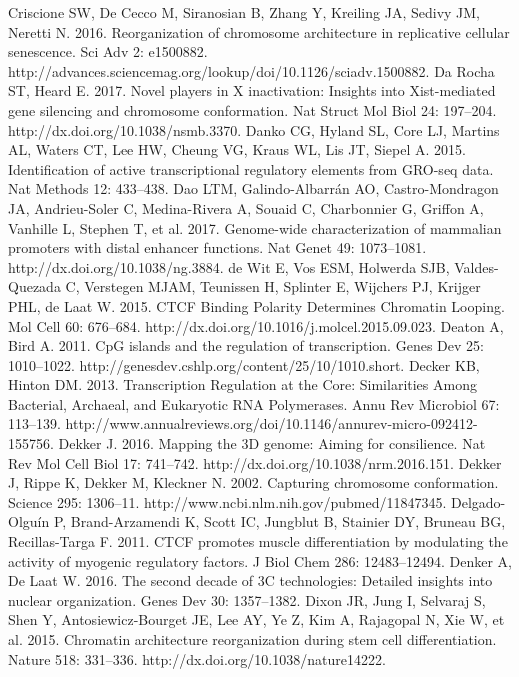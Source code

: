 \begin{thebibliography}{1}
	 Criscione SW, De Cecco M, Siranosian B, Zhang Y, Kreiling JA, Sedivy JM, Neretti N. 2016. Reorganization of chromosome architecture in replicative cellular senescence. Sci Adv 2: e1500882. http://advances.sciencemag.org/lookup/doi/10.1126/sciadv.1500882.
	 Da Rocha ST, Heard E. 2017. Novel players in X inactivation: Insights into Xist-mediated gene silencing and chromosome conformation. Nat Struct Mol Biol 24: 197–204. http://dx.doi.org/10.1038/nsmb.3370.
	 Danko CG, Hyland SL, Core LJ, Martins AL, Waters CT, Lee HW, Cheung VG, Kraus WL, Lis JT, Siepel A. 2015. Identification of active transcriptional regulatory elements from GRO-seq data. Nat Methods 12: 433–438.
	 Dao LTM, Galindo-Albarrán AO, Castro-Mondragon JA, Andrieu-Soler C, Medina-Rivera A, Souaid C, Charbonnier G, Griffon A, Vanhille L, Stephen T, et al. 2017. Genome-wide characterization of mammalian promoters with distal enhancer functions. Nat Genet 49: 1073–1081. http://dx.doi.org/10.1038/ng.3884.
	 de Wit E, Vos ESM, Holwerda SJB, Valdes-Quezada C, Verstegen MJAM, Teunissen H, Splinter E, Wijchers PJ, Krijger PHL, de Laat W. 2015. CTCF Binding Polarity Determines Chromatin Looping. Mol Cell 60: 676–684. http://dx.doi.org/10.1016/j.molcel.2015.09.023.
	 Deaton A, Bird A. 2011. CpG islands and the regulation of transcription. Genes Dev 25: 1010–1022. http://genesdev.cshlp.org/content/25/10/1010.short.
	 Decker KB, Hinton DM. 2013. Transcription Regulation at the Core: Similarities Among Bacterial, Archaeal, and Eukaryotic RNA Polymerases. Annu Rev Microbiol 67: 113–139. http://www.annualreviews.org/doi/10.1146/annurev-micro-092412-155756.
	 Dekker J. 2016. Mapping the 3D genome: Aiming for consilience. Nat Rev Mol Cell Biol 17: 741–742. http://dx.doi.org/10.1038/nrm.2016.151.
	 Dekker J, Rippe K, Dekker M, Kleckner N. 2002. Capturing chromosome conformation. Science 295: 1306–11. http://www.ncbi.nlm.nih.gov/pubmed/11847345.
	 Delgado-Olguín P, Brand-Arzamendi K, Scott IC, Jungblut B, Stainier DY, Bruneau BG, Recillas-Targa F. 2011. CTCF promotes muscle differentiation by modulating the activity of myogenic regulatory factors. J Biol Chem 286: 12483–12494.
	 Denker A, De Laat W. 2016. The second decade of 3C technologies: Detailed insights into nuclear organization. Genes Dev 30: 1357–1382.
	 Dixon JR, Jung I, Selvaraj S, Shen Y, Antosiewicz-Bourget JE, Lee AY, Ye Z, Kim A, Rajagopal N, Xie W, et al. 2015. Chromatin architecture reorganization during stem cell differentiation. Nature 518: 331–336. http://dx.doi.org/10.1038/nature14222.

\end{thebibliography}
